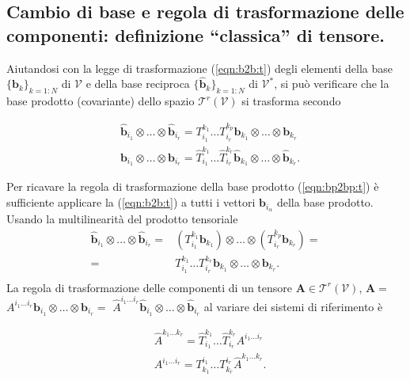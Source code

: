  \subsection{Cambio di base e regola di trasformazione delle componenti: definizione ``classica'' di tensore.} 
%
 Aiutandosi con la legge di trasformazione (\ref{eqn:b2b:t}) degli elementi della base $\{ \bm{b}_k \}_{k=1:N}$ di $\mathcal{V}$ e della base reciproca $\{ \bm{\hat{b}}_k \}_{k=1:N}$ di $\mathcal{V}^*$, si può verificare  che la base prodotto (covariante) dello spazio $\mathcal{T}^r(\mathcal{V})$ si trasforma secondo
\begin{fBox}
\begin{equation}\label{eqn:bp2bp:t}
\begin{aligned}
 &  \bm{\hat{b}}_{i_1} \otimes \dots \otimes \bm{\hat{b}}_{i_r} = 
  T^{k_1}_{i_1}\dots T^{k_p}_{i_r}
  \bm{b}_{k_1} \otimes \dots \otimes \bm{b}_{k_r} \\
  &  \bm{b}_{i_1} \otimes \dots \otimes \bm{b}_{i_r} = 
  \hat{T}^{k_1}_{i_1}\dots \hat{T}^{k_r}_{i_r}
  \bm{\hat{b}}_{k_1} \otimes \dots \otimes \bm{\hat{b}}_{k_r} .
\end{aligned}
\end{equation}
\end{fBox}
 Per ricavare la regola di trasformazione della base prodotto (\ref{eqn:bp2bp:t}) è sufficiente applicare la (\ref{eqn:b2b:t}) a tutti i vettori $\bm{b}_{i_\alpha}$ della base prodotto.  Usando la multilinearità del prodotto tensoriale
 \begin{equation}
 \begin{aligned}
  \bm{\hat{b}}_{i_1} \otimes \dots \otimes \bm{\hat{b}}_{i_r} = &
  ( T^{k_1}_{i_1}\bm{b}_{k_1} ) \otimes \dots \otimes ( T^{k_p}_{i_r}\bm{b}_{k_r}) = \\
  = & T^{k_1}_{i_1}\dots T^{k_r}_{i_r}
   \bm{b}_{k_1} \otimes \dots \otimes \bm{b}_{k_r} . \\
 \end{aligned}
 \end{equation}
%
 La regola di trasformazione delle componenti di un tensore $\bm{A} \in \mathcal{T}^r(\mathcal{V})$, $\bm{A} =$ $A^{i_1 \dots i_r} \bm{b}_{i_1} \otimes \dots \otimes \bm{b}_{i_r} =$ $\hat{A}^{i_1 \dots i_r} \bm{\hat{b}}_{i_1} \otimes \dots \otimes \bm{\hat{b}}_{i_r} $ al variare dei sistemi di riferimento è
\begin{fBox}
\begin{equation}\label{eqn:t2t:t}
\begin{aligned}
 &  \hat{A}^{k_1 \dots k_r} = 
  \hat{T}^{k_1}_{i_1}\dots \hat{T}^{k_r}_{i_r} A^{i_1 \dots i_r} \\
 &  A^{i_1 \dots i_r} = 
  T^{i_1}_{k_1}\dots T^{i_r}_{k_r} 
  \hat{A}^{k_1 \dots k_r} .
\end{aligned}
\end{equation}
\end{fBox}
